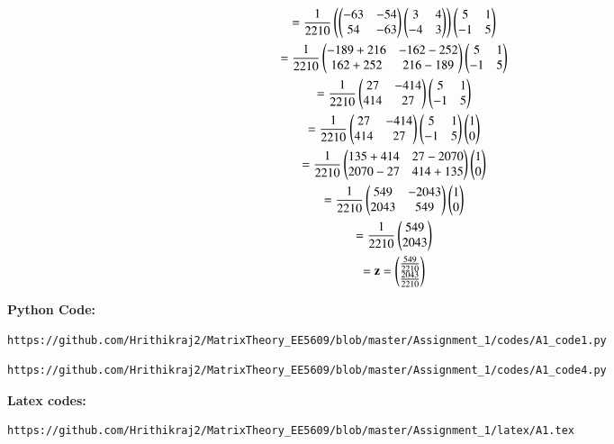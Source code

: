 \documentclass[journal,12pt,twocolumn]{IEEEtran}
\begin{document}
\begin{multline}
 = \frac{1}{2210}\left(\begin{pmatrix}-63 & -54 \\ 54 & -63\end{pmatrix} \begin{pmatrix}3 & 4 \\-4 & 3\end{pmatrix}\right) \begin{pmatrix}5 & 1 \\ -1 & 5\end{pmatrix}\\
 = \frac{1}{2210}\begin{pmatrix}-189+216 & -162-252 \\ 162+252 & 216-189\end{pmatrix}\begin{pmatrix}5 & 1 \\ -1 & 5\end{pmatrix}\\
 =\frac{1}{2210}\begin{pmatrix}27 & -414 \\ 414 & 27\end{pmatrix}\begin{pmatrix}5 & 1 \\ -1 & 5\end{pmatrix}\\
 =\frac{1}{2210}\begin{pmatrix} 27 & -414 \\  414 & 27\end{pmatrix} \begin{pmatrix}5 & 1 \\ -1 & 5\end{pmatrix}\begin{pmatrix}1 \\ 0\end{pmatrix}\\
 =\frac{1}{2210}\begin{pmatrix}135+414 & 27-2070 \\ 2070-27 & 414+135\end{pmatrix}\begin{pmatrix}1 \\ 0\end{pmatrix}\\
 =\frac{1}{2210}\begin{pmatrix}549 & -2043 \\ 2043 & 549\end{pmatrix}\begin{pmatrix}1 \\ 0\end{pmatrix}\\
 =\frac{1}{2210}\begin{pmatrix}549 \\ 2043\end{pmatrix}\\
 =\mathbf{z} = \begin{pmatrix}\frac{549}{2210} \\ \frac{2043}{2210}\end{pmatrix}
\end{multline}

\textbf{Python Code:}
\begin{lstlisting}
https://github.com/Hrithikraj2/MatrixTheory_EE5609/blob/master/Assignment_1/codes/A1_code1.py
\end{lstlisting}
\begin{lstlisting}
https://github.com/Hrithikraj2/MatrixTheory_EE5609/blob/master/Assignment_1/codes/A1_code4.py
\end{lstlisting}
\textbf{Latex codes:}
\begin{lstlisting}
https://github.com/Hrithikraj2/MatrixTheory_EE5609/blob/master/Assignment_1/latex/A1.tex
\end{lstlisting}
\end{document}
